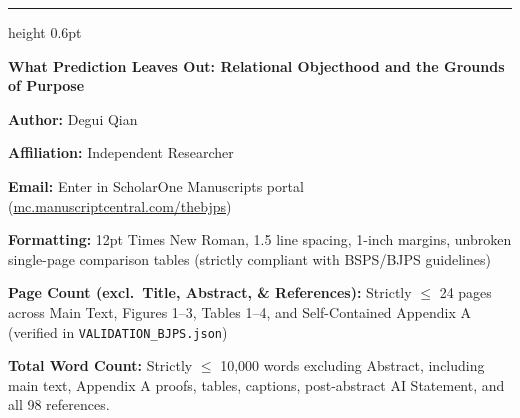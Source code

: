 \documentclass[11pt,letterpaper]{article}
\begin{document}
\pagestyle{empty}
\vspace{8pt}
\hrule height 0.6pt
\vspace{12pt}
{\raggedright\fontsize{16}{20.5}\selectfont\bfseries What Prediction Leaves Out: Relational Objecthood and the Grounds of Purpose\par}
\vspace{10pt}
{\raggedright\setlength{\parskip}{3pt}
\noindent\textbf{Author:} Degui Qian\par
\noindent\textbf{Affiliation:} Independent Researcher\par
\noindent\textbf{Email:} Enter in ScholarOne Manuscripts portal (\url{mc.manuscriptcentral.com/thebjps})\par
\noindent\textbf{Formatting:} 12pt Times New Roman, 1.5 line spacing, 1-inch margins, unbroken single-page comparison tables (strictly compliant with BSPS/BJPS guidelines)\par
\noindent\textbf{Page Count (excl.\ Title, Abstract, \& References):} Strictly $\le$ 24 pages across Main Text, Figures 1--3, Tables 1--4, and Self-Contained Appendix A (verified in \texttt{VALIDATION\_BJPS.json})\par
\noindent\textbf{Total Word Count:} Strictly $\le$ 10,000 words excluding Abstract, including main text, Appendix A proofs, tables, captions, post-abstract AI Statement, and all 98 references.\par
}
\end{document}
